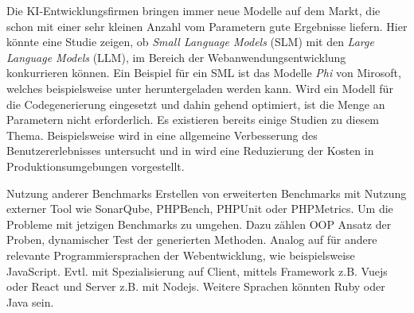 Die KI-Entwicklungsfirmen bringen immer neue Modelle auf dem Markt, die schon mit einer sehr kleinen Anzahl vom Parametern gute Ergebnisse liefern. Hier könnte eine Studie zeigen, ob \textit{Small Language Models} (SLM) mit den \textit{Large Language Models} (LLM), im Bereich der Webanwendungsentwicklung konkurrieren können. Ein Beispiel für ein SML ist das Modelle \textit{Phi} von Mirosoft, welches beispielsweise unter \cite{phi2_huggingface_2024} heruntergeladen werden kann. Wird ein Modell für die Codegenerierung eingesetzt und dahin gehend optimiert, ist die Menge an Parametern nicht erforderlich. Es existieren bereits einige Studien zu diesem Thema. Beispielsweise wird in \cite{hu-2024} eine allgemeine Verbesserung des Benutzererlebnisses untersucht und in \cite{irugalbandara-2023} wird eine Reduzierung der Kosten in Produktionsumgebungen vorgestellt.\vspace{0.2cm}

Nutzung anderer Benchmarks
Erstellen von erweiterten Benchmarks mit Nutzung externer Tool wie SonarQube, PHPBench, PHPUnit oder PHPMetrics. Um die Probleme mit jetzigen Benchmarks zu umgehen. Dazu zählen OOP Ansatz der Proben, dynamischer Test der generierten Methoden. Analog auf für andere relevante Programmiersprachen der Webentwicklung, wie beispielsweise JavaScript. Evtl. mit Spezialisierung auf Client, mittels Framework z.B. Vuejs oder React und Server z.B. mit Nodejs. Weitere Sprachen könnten Ruby oder Java sein.\vspace{0.2cm}

